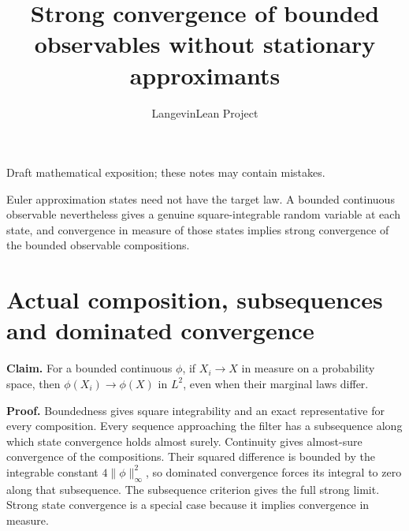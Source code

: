 \documentclass[11pt,a4paper]{article}
\title{\texorpdfstring{Strong convergence of bounded observables without stationary approximants}{Strong convergence of bounded observables without stationary approximants}}
\author{LangevinLean Project}
\date{}
\begin{document}
\maketitle
Draft mathematical exposition; these notes may contain mistakes.


Euler approximation states need not have the target law. A bounded continuous observable nevertheless gives a genuine square-integrable random variable at each state, and convergence in measure of those states implies strong convergence of the bounded observable compositions.


\section{\texorpdfstring{Actual composition, subsequences and dominated convergence}{Actual composition, subsequences and dominated convergence}}


\textbf{Claim.} For a bounded continuous \(\phi\), if \(X_i\to X\) in measure on a probability space, then \(\phi(X_i)\to\phi(X)\) in \(L^2\), even when their marginal laws differ.



\textbf{Proof.} Boundedness gives square integrability and an exact representative for every composition. Every sequence approaching the filter has a subsequence along which state convergence holds almost surely. Continuity gives almost-sure convergence of the compositions. Their squared difference is bounded by the integrable constant \(4\|\phi\|_\infty^2\), so dominated convergence forces its integral to zero along that subsequence. The subsequence criterion gives the full strong limit. Strong state convergence is a special case because it implies convergence in measure.
\end{document}
